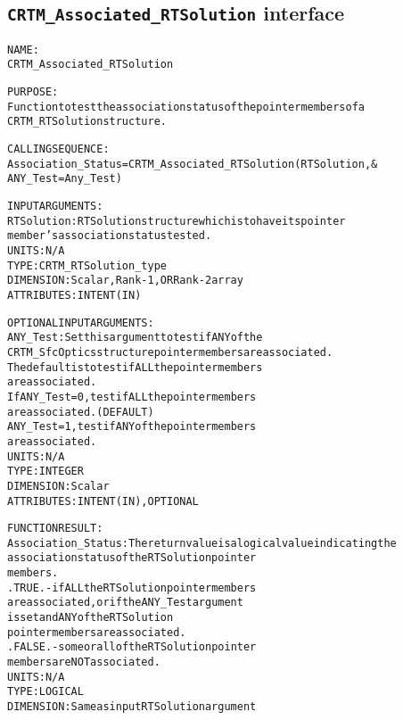 \subsection{\texttt{CRTM\_Associated\_RTSolution} interface}
  \label{sec:CRTM_Associated_RTSolution_interface}
  \begin{alltt}
 
  NAME:
        CRTM_Associated_RTSolution
 
  PURPOSE:
        Function to test the association status of the pointer members of a
        CRTM_RTSolution structure.
 
  CALLING SEQUENCE:
        Association_Status = CRTM_Associated_RTSolution( RTSolution       , &
                                                         ANY_Test=Any_Test  )
 
  INPUT ARGUMENTS:
        RTSolution:          RTSolution structure which is to have its pointer
                             member's association status tested.
                             UNITS:      N/A
                             TYPE:       CRTM_RTSolution_type
                             DIMENSION:  Scalar, Rank-1, OR Rank-2 array
                             ATTRIBUTES: INTENT(IN)
 
 
  OPTIONAL INPUT ARGUMENTS:
        ANY_Test:            Set this argument to test if ANY of the
                             CRTM_SfcOptics structure pointer members are associated.
                             The default is to test if ALL the pointer members
                             are associated.
                             If ANY_Test = 0, test if ALL the pointer members
                                              are associated.  (DEFAULT)
                                ANY_Test = 1, test if ANY of the pointer members
                                              are associated.
                             UNITS:      N/A
                             TYPE:       INTEGER
                             DIMENSION:  Scalar
                             ATTRIBUTES: INTENT(IN), OPTIONAL
 
  FUNCTION RESULT:
        Association_Status:  The return value is a logical value indicating the
                             association status of the RTSolution pointer
                             members.
                             .TRUE.  - if ALL the RTSolution pointer members
                                       are associated, or if the ANY_Test argument
                                       is set and ANY of the RTSolution
                                       pointer members are associated.
                             .FALSE. - some or all of the RTSolution pointer
                                       members are NOT associated.
                             UNITS:      N/A
                             TYPE:       LOGICAL
                             DIMENSION:  Same as input RTSolution argument
 
  \end{alltt}
